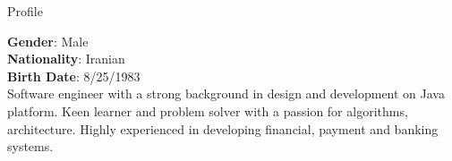 
\begin{jrsection}[location = sidebar]{Profile}
    \begin{jrdescription}
        {\bfseries Gender}: Male \\
        {\bfseries Nationality}: Iranian \\
        {\bfseries Birth Date}: 8/25/1983 \\
        Software engineer with a strong background in design and development on Java platform.
        Keen learner and problem solver with a passion for algorithms, architecture.
        Highly experienced in developing financial, payment and banking systems.
    \end{jrdescription}
\end{jrsection}
